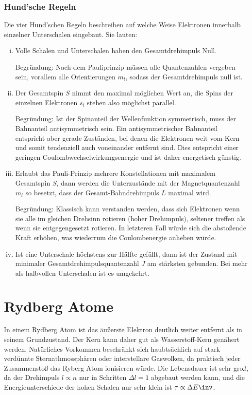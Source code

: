\documentclass[twocolumn]{summery_4.1}
\begin{document}
\subsubsection{Hund'sche Regeln}
Die vier Hund'schen Regeln beschreiben auf welche Weise Elektronen innerhalb einzelner Unterschalen eingebaut. Sie lauten:
\begin{enumerate}[(i)]
    \item Volle Schalen und Unterschalen haben den Gesamtdrehimpuls Null. 
    
    Begründung: Nach dem Pauliprinzip müssen alle Quantenzahlen vergeben sein, vorallem alle Orientierungen \(m_l\), sodass der Gesamtdrehimpuls null ist.
    
    \item Der Gesamtspin $S$ nimmt den maximal möglichen Wert an, die Spins der einzelnen Elektronen $s_i$ stehen also möglichst parallel. 
    
    Begründung: Ist der Spinanteil der Wellenfunktion symmetrisch, muss der Bahnanteil antisymmetrisch sein. Ein antisymmetrischer Bahnanteil entspricht aber gerade Zuständen, bei denen die Elektronen weit vom Kern und somit tendenziell auch voneinander entfernt sind. Dies entspricht einer geringen Coulombwechselwirkungsenergie und ist daher energetisch günstig.

    \item Erlaubt das Pauli-Prinzip mehrere Konstellationen mit maximalem Gesamtspin $S$, dann werden die Unterzustände mit der Magnetquantenzahl $m _l$ so besetzt, dass der Gesamt-Bahndrehimpuls $L$ maximal wird.  
    
    Begründung: Klassisch kann verstanden werden, dass sich Elektronen wenn sie alle im gleichen Drehsinn rotieren (hoher Drehimpuls), seltener treffen als wenn sie entgegengesetzt rotieren. In letzteren Fall würde sich die abstoßende Kraft erhöhen, was wiederrum die Coulombenergie anheben würde.  
    
    \item Ist eine Unterschale höchstens zur Hälfte gefüllt, dann ist der Zustand mit minimaler Gesamtdrehimpulsquantenzahl $J$ am stärksten gebunden. Bei mehr als halbvollen Unterschalen ist es umgekehrt.   
\end{enumerate}


\section{Rydberg Atome}
In einem Rydberg Atom ist das äußerste Elektron deutlich weiter entfernt als in seinem Grundzustand. Der Kern kann daher gut als Wasserstoff-Kern genähert werden. Natürliches Vorkommen beschränkt sich haubtsächlich auf stark verdünnte Sternathmossphären oder interstellare Gaswolken, da praktisch jeder Zusammenstoß das Ryberg Atom ionisieren würde. Die Lebensdauer ist sehr groß, da der Drehimpuls \(l\propto n\) nur in Schritten \(\Delta l = 1\) abgebaut werden kann, und die Energieunterschiede der hohen Schalen nur sehr klein ist \(\tau \propto \Delta E\inv \). 
\end{document}

